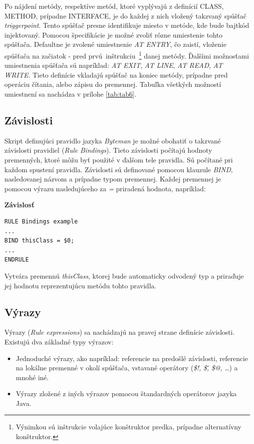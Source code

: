 \documentclass[11pt,final,oneside]{fithesis}
\newenvironment{example}[1]
{
\vspace{3mm}
\noindent\textbf{#1}
\vspace{2mm}
}
{
\vspace{3mm}
}
\begin{document}
Po nájdení metódy, respektíve metód, ktoré vyplývajú z definícií CLASS, METHOD,
prípadne INTERFACE, je do každej z nich vložený takzvaný spúšťač
\textit{triggerpoint}. Tento spúšťač presne identifikuje miesto v metóde, kde
bude bajtkód injektovaný. Pomocou špecifikácie je možné zvoliť rôzne 
umiestenie tohto spúšťača. Defaultne je zvolené umiestnenie \textit{AT ENTRY}, 
čo zaistí, vloženie spúšťača na začiatok -
pred prvú~inštrukciu~\footnote{Výnimkou sú inštrukcie volajúce konštruktor 
predka, prípadne alternatívny 
konštruktor.} danej metódy. Ďalšími možnosťami umiestnenia spúšťača sú 
napríklad: \textit{AT EXIT}, \textit{AT LINE}, \textit{AT READ},
\textit{AT WRITE}. Tieto definície vkladajú spúšťač na koniec metódy, prípadne 
pred operáciu čítania, alebo zápisu do premennej. Tabuľka všetkých možností 
umiestnení sa nachádza v prílohe \ref{tab:tab6}.

\subsection{Závislosti}
Skript definujúci  pravidlo jazyka \textit{Byteman} je možné obohatiť o 
takzvané závislosti pravidiel (\textit{Rule Bindings}). Tieto závislosti 
počítajú hodnoty premenných, ktoré môžu byť použité v ďalšom tele pravidla. Sú 
počítané pri každom spustení pravidla. Závislosti sú definované pomocou 
klauzule \textit{BIND}, nasledovanej názvom a prípadne typom premennej. Každej 
premennej je pomocou výrazu nasledujúceho za \textit{=} priradená hodnota, 
napríklad:

\begin{example}{Závislosť}
\begin{verbatim}
RULE Bindings example
...
BIND thisClass = $0;
...
ENDRULE
\end{verbatim}
\end{example}

Vytvára premennú \textit{thisClass}, ktorej bude automaticky odvodený typ a 
priraďuje jej hodnotu reprezentujúcu metódu tohto pravidla.

\subsection{Výrazy}
Výrazy (\textit{Rule expressions}) sa nachádzajú na pravej strane definície 
závislosti. Existujú dva základné typy výrazov:
\begin{itemize}
\item Jednoduché výrazy, ako napríklad: referencie na predošlé závislosti, 
referencie na lokálne premenné v okolí spúšťača, vstavané operátory
(\textit{\$!, \$\^, \$@, …}) a mnohé iné.
\item Výrazy zložené z iných výrazov pomocou štandardných operátorov jazyka 
Java.
\end{itemize}
\end{document}
